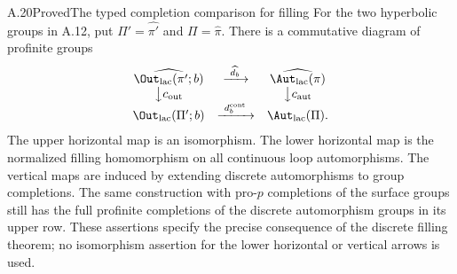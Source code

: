 \begin{claim}{A.20}{Proved}{The typed completion comparison for filling}
For the two hyperbolic groups in A.12, put $\Pi'=\widehat{\pi'}$ and $\Pi=\widehat\pi$. There is a commutative diagram of profinite groups
\[
\begin{array}{ccc}
 \widehat{\Out_{\mathrm{lac}}(\pi';b)}
 &\xrightarrow{\ \widehat{d_b}\ }&
 \widehat{\Aut_{\mathrm{lac}}(\pi)}\\
 \big\downarrow c_{\mathrm{out}}&&\big\downarrow c_{\mathrm{aut}}\\
 \Out_{\mathrm{lac}}(\Pi';b)
 &\xrightarrow{\ d_b^{\mathrm{cont}}\ }&
 \Aut_{\mathrm{lac}}(\Pi).
\end{array}
\]
The upper horizontal map is an isomorphism. The lower horizontal map is the normalized filling homomorphism on all continuous loop automorphisms. The vertical maps are induced by extending discrete automorphisms to group completions. The same construction with pro-$p$ completions of the surface groups still has the full profinite completions of the discrete automorphism groups in its upper row. These assertions specify the precise consequence of the discrete filling theorem; no isomorphism assertion for the lower horizontal or vertical arrows is used.
\end{claim}
